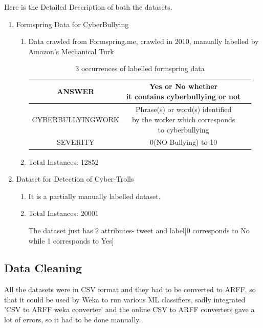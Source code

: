 \documentclass[10pt,conference]{IEEEtran}
\begin{document}
Here is the Detailed Description of both the datasets.
\begin{enumerate}

    \item Formspring Data for CyberBullying \cite{b1}
    \begin{enumerate}
        \item
        Data crawled from Formspring.me, crawled in 2010, manually labelled by Amazon’s Mechanical Turk
        
        \begin{table}[htbp]
        \caption{3 occurrences of labelled formspring data}
        \begin{center}
        
        \begin{tabular}{|c|c|c|}
            \hline
              ANSWER & \makecell{Yes or No whether \\ it contains
              cyberbullying or not} \\
             \hline
             CYBERBULLYINGWORK & \makecell{ Phrase(s) or word(s)  identified \\ by the worker which corresponds \\ to  cyberbullying} \\
             \hline
             SEVERITY & 0(NO Bullying) to 10 \\
             \hline
            
        \end{tabular}
        \end{center}
        \end{table}
        
        
        \item
        Total Instances: 12852  
      \end{enumerate}
    \item Dataset for Detection of Cyber-Trolls \cite{b2}
    \begin{enumerate}
        \item It is a partially manually labelled dataset.
        \item Total Instances: 20001
        
The dataset just has 2 attributes- tweet and label[0 corresponds to No while 1 corresponds to Yes]
    \end{enumerate}
\end{enumerate}
\subsection{Data Cleaning}
All the datasets were in CSV format and they had to be converted to ARFF, so that it could be used by Weka to run various ML classifiers, sadly integrated 'CSV to ARFF weka converter' and the online CSV to ARFF converters gave a lot of errors, so it had to be done manually.
\end{document}
